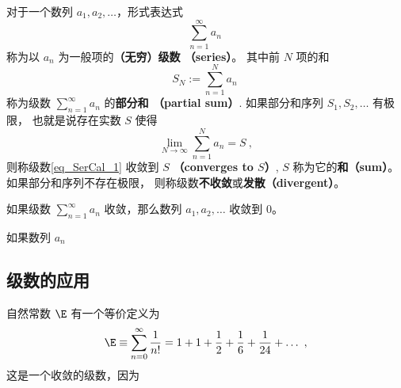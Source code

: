 
\begin{issues}
\issueDraft
\end{issues}


对于一个数列 $a_1,a_2,\dots$，形式表达式
\begin{equation}\label{eq_SerCal_1}
\sum_{n=1}^\infty a_n~
\end{equation}
称为以 $a_n$ 为一般项的\textbf{（无穷）级数 （series）}。 其中前 $N$ 项的和
\begin{equation}
S_N:=\sum_{n=1}^N a_n~
\end{equation}
称为级数 $\sum_{n=1}^\infty a_n$ 的\textbf{部分和 （partial sum）}. 如果部分和序列 $S_1,S_2,\dots$ 有极限， 也就是说存在实数 $S$ 使得
\begin{equation}
\lim_{N\to\infty}\sum_{n=1}^N a_n=S~,
\end{equation}
则称级数\autoref{eq_SerCal_1} 收敛到 $S$ \textbf{（converges to $S$）}, $S$ 称为它的\textbf{和（sum）}。 如果部分和序列不存在极限， 则称级数\textbf{不收敛}或\textbf{发散（divergent）}。

\begin{theorem}{}
如果级数 $\sum_{n=1}^\infty a_n$ 收敛，那么数列 $a_1, a_2, \dots$ 收敛到 $0$。
\end{theorem}
如果数列 $a_n$




\subsection{级数的应用}



自然常数 $\E$ 有一个等价定义为
\begin{equation}
\E \equiv \sum_{n=0}^\infty \frac{1}{n!} = 1 + 1 + \frac{1}{2} + \frac{1}{6} + \frac{1}{24} +\dots~,
\end{equation}
这是一个收敛的级数，因为
